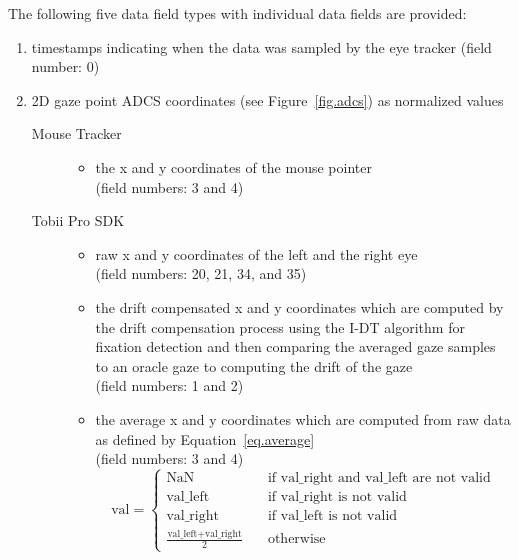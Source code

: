 \documentclass[a4paper,oneside]{book}
\begin{document}
The following five data field types with individual data fields are provided:
\begin{enumerate}
    \item timestamps indicating when the data was sampled by the eye tracker (field number: 0)
    \item 2D gaze point ADCS coordinates (see Figure~\ref{fig.adcs}) as normalized values
        \begin{description}
            \item[Mouse Tracker] \hfill
                \begin{itemize}
                    \item the x and y coordinates of the mouse pointer\\
                        (field numbers: 3 and 4)
                \end{itemize}
            \item[Tobii Pro SDK] \hfill
                \begin{itemize}
                    \item raw x and y coordinates of the left and the right eye\\
                        (field numbers: 20, 21, 34, and 35)
                    \item the drift compensated x and y coordinates which are computed by the drift compensation process using the I-DT algorithm for fixation detection and then comparing the averaged gaze samples to an oracle gaze to computing the drift of the gaze\\
                        (field numbers: 1 and 2)
                    \item the average x and y coordinates which are computed from raw data as defined by Equation~\ref{eq.average}\\
                        (field numbers: 3 and 4)
\begin{equation}
    \label{eq.average}
    \text{val} =
        \begin{cases}
            \text{NaN}                                      & \quad \text{if val\_right and val\_left are not valid}\\
            \text{val\_left}                                & \quad \text{if val\_right is not valid}\\
            \text{val\_right}                               & \quad \text{if val\_left is not valid}\\
            \frac{\text{val\_left} + \text{val\_right}}{2}  & \quad \text{otherwise}

\end{cases}
\end{equation}
\end{itemize}
\end{description}
\end{enumerate}
\end{document}
